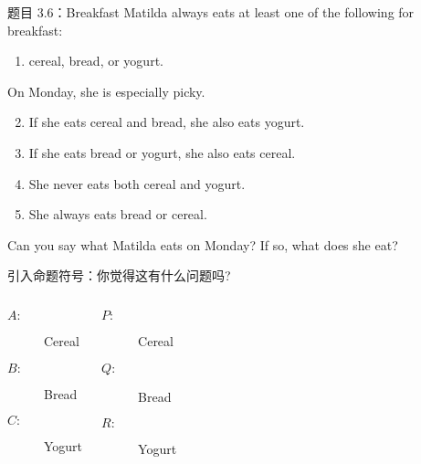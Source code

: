 % 

\begin{frame}{}
  \begin{exampleblock}{题目 3.6：Breakfast}
    Matilda always eats at least one of the following for breakfast: \\
    \begin{enumerate}
      \item cereal, bread, or yogurt. 
    \end{enumerate}
    On Monday, she is especially picky.

    \begin{enumerate}
      \setcounter{enumi}{1}
      \item If she eats cereal and bread, she also eats yogurt.
      \item If she eats bread or yogurt, she also eats cereal.
      \item She never eats both cereal and yogurt.
      \item She always eats bread or cereal.
    \end{enumerate}

    Can you say what Matilda eats on Monday? If so, what does she eat?
  \end{exampleblock}
\end{frame}

\begin{frame}{}
  引入命题符号：你觉得这有什么问题吗?
  \begin{columns}
      \begin{description}
	\item[$A:$] Cereal
	\item[$B:$] Bread
	\item[$C:$] Yogurt
      \end{description}
      \begin{description}
	\item[$P:$] Cereal
	\item[$Q:$] Bread
	\item[$R:$] Yogurt
      \end{description}
  \end{columns}

  \vspace{0.30cm}
  \pause
\end{frame}

